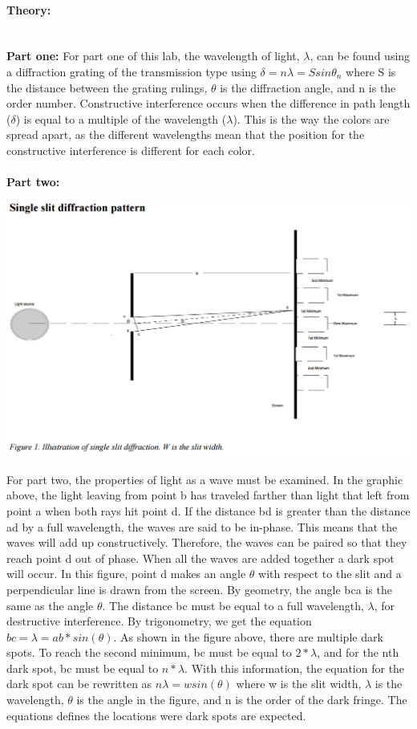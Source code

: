 \documentclass[12pt]{article}
\begin{document}
\paragraph{Theory:}\mbox{} \\
\textbf{Part one:}
For part one of this lab, the wavelength of light, $\lambda$, can be found using a diffraction grating of the transmission type using $\delta = n \lambda = S sin \theta_n$ where S is the distance between the grating rulings, $\theta$ is the diffraction angle, and n is the order number. Constructive interference occurs when the difference in path length ($\delta$) is equal to a multiple of the wavelength ($\lambda$). This is the way the colors are spread apart, as the different wavelengths mean that the position for the constructive interference is different for each color. \mbox{} \\ \mbox{} \\
\textbf{Part two:}
\begin{center}
\includegraphics[width=17cm]{singleslit_part2.png}
\end{center}

For part two, the properties of light as a wave must be examined. In the graphic above, the light leaving from point b has traveled farther than light that left from point a when both rays hit point d. If the distance bd is greater than the distance ad by a full wavelength, the waves are said to be in-phase. This means that the waves will add up constructively. Therefore, the waves can be paired so that they reach point d out of phase. When all the waves are added together a dark spot will occur. In this figure, point d makes an angle $\theta$ with respect to the slit and a perpendicular line is drawn from the screen. By geometry, the angle bca is the same as the angle $\theta$. The distance bc must be equal to a full wavelength, $\lambda$, for destructive interference. By trigonometry, we get the equation $ bc= \lambda = ab *sin(\theta)$. As shown in the figure above, there are multiple dark spots. To reach the second minimum, bc must be equal to $2*\lambda$, and for the nth dark spot, bc must be equal to $n*\lambda$. With this information, the equation for the dark spot can be rewritten as $ n \lambda = w sin(\theta)$ where w is the slit width, $\lambda$ is the wavelength, $\theta$ is the angle in the figure, and n is the order of the dark fringe. The equations defines the locations were dark spots are expected.
\end{document}
